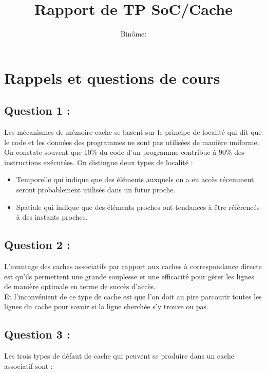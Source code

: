 \documentclass[11pt,a4paper]{article}
\begin{document}
\title{Rapport de TP SoC/Cache}
\author{Binôme:}
\maketitle
\section{Rappels et questions de cours}
    \subsection{Question 1 :}
Les mécanismes de mémoire cache se basent sur le principe de localité qui dit
que le code et les données des programmes ne sont pas utilisées de manière
uniforme. On constate souvent que 10\% du code d'un programme contribue à 90\%
des instructions exécutées. On distingue deux types de localité : \\

\begin{itemize}
    \item Temporelle qui indique que des éléments auxquels on a eu accès
      récemment seront probablement utilisés dans un futur proche.
    \item Spatiale qui indique que des éléments proches ont tendances à être
      référencés à des instants proches.
\end{itemize}

    \subsection{Question 2 :}
    
L'avantage des caches associatifs par rapport aux caches à correspondance
directe est qu'ils permettent une grande souplesse et une efficacité pour gérer
les lignes de manière optimale en terme de succès d’accès. \\

Et l'inconvénient de ce type de cache est que l'on doit au pire parcourir toutes
les lignes du cache pour savoir si la ligne cherchée s’y trouve ou pas.
    
    \subsection{Question 3 :}
    
Les trois types de défaut de cache qui peuvent se produire dans un cache
associatif sont : \\
\end{document}

